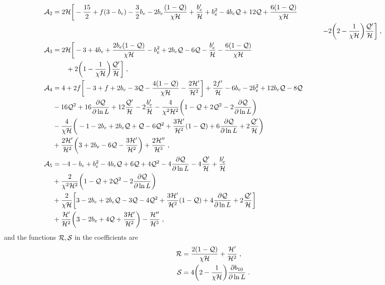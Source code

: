 \begin{align}
\mathcal{A}_{2} &= 2\mathcal{H}\bigg[-\frac{15}{2}+f(3-b_{e})-\frac{3}{2}b_{e}-2b_{e}\frac{(1-\mathcal{Q})}{\chi\mathcal{H}}+\frac{b_{e}'}{\mathcal{H}}+b_{e}^{2}-4b_{e}\mathcal{Q}+12\mathcal{Q}+\frac{6(1-\mathcal{Q})}{\chi\mathcal{H}} \nonumber \\
&&\qquad -2\bigg(2-\frac{1}{\chi\mathcal{H}}\bigg)\frac{\mathcal{Q}'}{\mathcal{H}}\bigg]\;, \label{e4} \\
\mathcal{A}_{3} &= 2\mathcal{H}\bigg[-3+4b_{e}+\frac{2b_{e}(1-\mathcal{Q})}{\chi\mathcal{H}}-b_{e}^{2}+2b_{e}\mathcal{Q} -6\mathcal{Q}-\frac{b_{e}'}{\mathcal{H}}-\frac{6(1-\mathcal{Q})}{\chi\mathcal{H}} \nonumber \\
& \qquad +2\bigg(1-\frac{1}{\chi\mathcal{H}}\bigg)\frac{\mathcal{Q}'}{\mathcal{H}}\bigg]\;, \label{e3} 
\\ 
\mathcal{A}_{4} &= 4 +2f\bigg[-3+f+2b_{e}-3\mathcal{Q}-\frac{4(1-\mathcal{Q})}{\chi\mathcal{H}}-\frac{2\mathcal{H}'}{\mathcal{H}^{2}}\bigg] +\frac{2f'}{\mathcal{H}}-6b_{e}-2b_{e}^{2}+12b_{e}\mathcal{Q}-{8}\mathcal{Q} \nonumber\\
& -16\mathcal{Q}^{2}+16\frac{\partial \mathcal{Q}}{\partial \ln{{L}}} +12\frac{\mathcal{Q}'}{\mathcal{H}} -2\frac{b_{e}'}{\mathcal{H}} -\frac{4}{\chi^{2}\mathcal{H}^{2}}\bigg(1-\mathcal{Q}+2\mathcal{Q}^{2}-2\frac{\partial \mathcal{Q}}{\partial \ln{{L}}}\bigg)  \nonumber \\
& - \frac{4}{\chi \mathcal{H}}\bigg(-1 -2b_{e}+2b_{e}\mathcal{Q}+\mathcal{Q}-6\mathcal{Q}^{2}+\frac{3\mathcal{H}'}{\mathcal{H}^{2}}(1-\mathcal{Q}) +6\frac{\partial \mathcal{Q}}{\partial \ln{{L}}} + 2\frac{\mathcal{Q}'}{\mathcal{H}}\bigg)  \nonumber \\
& + \frac{2\mathcal{H}'}{\mathcal{H}^{2}}\bigg(3+2b_{e}-6\mathcal{Q}-\frac{3\mathcal{H}'}{\mathcal{H}^{2}}\bigg) + \frac{2\mathcal{H}''}{\mathcal{H}^{3}}\;, \label{e5}\\
\mathcal{A}_{5} &=  -4-b_{e}+b_{e}^{2}-4b_{e}\mathcal{Q}+ {6}\mathcal{Q}+4\mathcal{Q}^{2}-4\frac{\partial \mathcal{Q}}{\partial \ln{{L}}} - 4\frac{\mathcal{Q}'}{\mathcal{H}} + \frac{b_{e}'}{\mathcal{H}} \nonumber \\
& + \frac{2}{\chi^{2}\mathcal{H}^{2}}\bigg(1-\mathcal{Q}+2\mathcal{Q}^{2}-2\frac{\partial \mathcal{Q}}{\partial \ln{{L}}}\bigg) \nonumber \\
& + \frac{2}{\chi\mathcal{H}}\bigg[3-2b_{e}+2b_{e}\mathcal{Q}-3\mathcal{Q}-4\mathcal{Q}^{2}+\frac{3\mathcal{H}'}{\mathcal{H}^{2}}(1-\mathcal{Q}) + 4\frac{\partial \mathcal{Q}}{\partial \ln{{L}}} + 2\frac{\mathcal{Q}'}{\mathcal{H}}\bigg]  \nonumber \\
& + \frac{\mathcal{H}'}{\mathcal{H}^{2}}\bigg(3-2b_{e}+{4}\mathcal{Q}+\frac{3\mathcal{H}'}{\mathcal{H}^{2}}\bigg) - \frac{\mathcal{H}''}{\mathcal{H}^{3}}\;, \label{e6} 
\end{align}
and the functions ${\cal R}, {\cal S}$ in the coefficients are
\begin{align}
\mathcal{R} &= \frac{2(1-\mathcal{Q})}{\chi\mathcal{H}}+\frac{\mathcal{H}'}{\mathcal{H}^{2}}\;, \label{e1}\\
\mathcal{S} &= 4\bigg(2-\frac{1}{\chi\mathcal{H}}\bigg)\frac{\partial b_{10}}{\partial \ln{{L}}}\;. \label{e1'}
\end{align}

